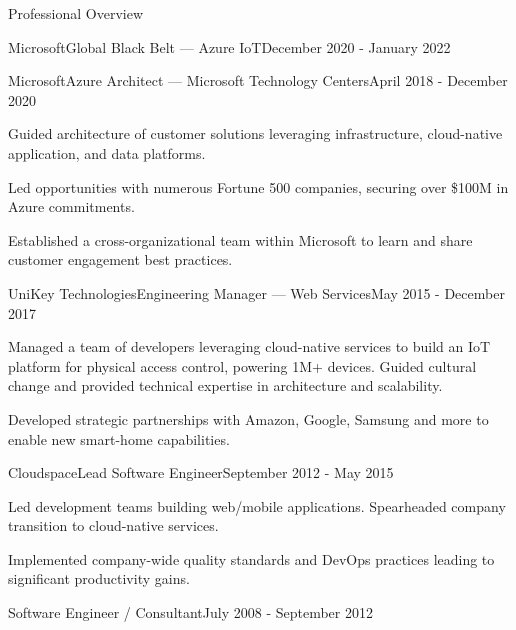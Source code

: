 \documentclass{resume} %
\begin{document}
\begin{rSection}{Professional Overview}
\begin{rNewRole}{Microsoft}{Global Black Belt --- Azure IoT}{December 2020 - January 2022}
  \end{rNewRole}

  \begin{rNewRole}{Microsoft}{Azure Architect --- Microsoft Technology Centers}{April 2018 - December 2020}
      
    \item Guided architecture of customer solutions leveraging infrastructure, cloud-native application, and data platforms.
    \item Led opportunities with numerous Fortune 500 companies, securing over \$100M in Azure commitments.
    \item Established a cross-organizational team within Microsoft to learn and share customer engagement best practices.
    
  \end{rNewRole}
  
  
  \begin{rNewRole}{UniKey Technologies}{Engineering Manager --- Web Services}{May 2015 - December 2017}
    
    \item Managed a team of developers leveraging cloud-native services to build an IoT platform for physical access control, powering 1M+ devices.  Guided cultural change and provided technical expertise in architecture and scalability.
    \item Developed strategic partnerships with Amazon, Google, Samsung and more to enable new smart-home capabilities.
    
  \end{rNewRole}
  
  
  \begin{rNewRole}{Cloudspace}{Lead Software Engineer}{September 2012 - May 2015}
    
    \item Led development teams building web/mobile applications. Spearheaded company transition to cloud-native services.
    \item Implemented company-wide quality standards and DevOps practices leading to significant productivity gains.
    
  \end{rNewRole}
  
  
  \begin{rCompany}{Software Engineer / Consultant}{July 2008 - September 2012}{}

  \end{rCompany}
  
  
  
\end{rSection}
\end{document}
